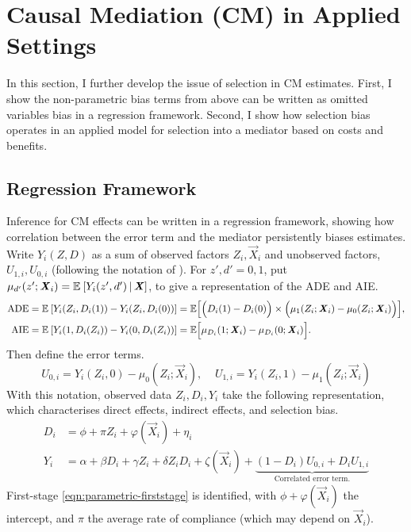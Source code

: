 \section{Causal Mediation (CM) in Applied Settings}
\label{sec:selection}
In this section, I further develop the issue of selection in CM estimates. First, I show the non-parametric bias terms from above can be written as omitted variables bias in a regression framework.
Second, I show how selection bias operates in an applied model for selection into a mediator based on costs and benefits.

\subsection{Regression Framework}
\label{sec:regression}
Inference for CM effects can be written in a regression framework, showing how correlation between the error term and the mediator persistently biases estimates.
Write $Y_i(Z, D)$ as a sum of observed factors $Z_i, \vec X_i$ and unobserved factors, $U_{1,i}, U_{0,i}$ (following the notation of \citealt{heckman2005structural}).
For $z',d' = 0,1$, put $\mu_{d'}(z'; \boldsymbol{\mathit{X}}_i) = \mathbb{E}_{} \left[ Y_i(z', d') \, \middle\vert \, \boldsymbol{\mathit{X}} \right]$, to give a representation of the ADE and AIE.
\begin{align*}
    \text{ADE}
    = \mathbb{E}_{} \left[ Y_i(Z_i, D_i(1)) - Y_i(Z_i, D_i(0)) \right]
    &= \mathbb{E} \Big[ \Big( D_i(1) - D_i(0) \Big)
        \times \Big( \mu_1(Z_i; \boldsymbol{\mathit{X}}_i) - \mu_0(Z_i; \boldsymbol{\mathit{X}}_i) \Big) \Big], \\
    \text{AIE}    
    = \mathbb{E}_{} \left[ Y_i(1, D_i(Z_i)) - Y_i(0, D_i(Z_i)) \right]
        &= \mathbb{E} \Big[ \mu_{D_i}(1; \boldsymbol{\mathit{X}}_i) - \mu_{D_i}(0; \boldsymbol{\mathit{X}}_i) \Big].
\end{align*}
Then define the error terms.
\[ U_{0,i} = Y_i(Z_i, 0) - \mu_0(Z_i; \vec X_i),\;\;\;\;
U_{1,i} = Y_i(Z_i, 1) - \mu_1(Z_i; \vec X_i) \]
With this notation, observed data $Z_i, D_i, Y_i$ take the following representation, which characterises direct effects, indirect effects, and selection bias.
\begin{align}
    \label{eqn:parametric-firststage}
    D_i &= \phi + \pi Z_i + \varphi(\vec X_i) + \eta_i  \\
    \label{eqn:parametric-secondstage}
    Y_i &= \alpha + \beta D_i + \gamma Z_i + \delta Z_i D_i
    + \zeta(\vec X_i)
    + \underbrace{\left(1 - D_i \right)U_{0,i} + D_i U_{1,i}}_{
        \text{Correlated error term.}}
\end{align}
First-stage \eqref{eqn:parametric-firststage} is identified, with $\phi + \varphi(\vec X_i)$ the intercept, and $\pi$ the average rate of compliance (which may depend on $\vec X_i$).
